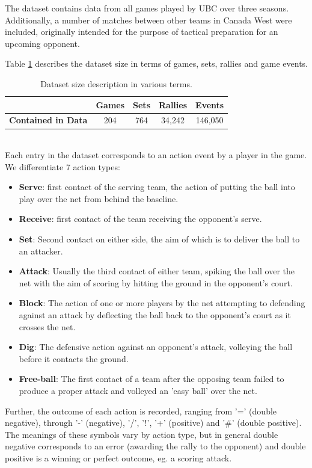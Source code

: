 \documentclass{sfuthesis}
\begin{document}
	The dataset contains data from all games played by UBC over three seasons. Additionally, a number of matches between other teams in Canada West were included, originally intended for the purpose of tactical preparation for an upcoming opponent.
	
	Table \ref{tab:data-numbers} describes the dataset size in terms of games, sets, rallies and game events.\\
	\begin{table}[ht]
		\centering
		\begin{tabular}{c|c|c|c|c}
			& \textbf{Games} & \textbf{Sets} & \textbf{Rallies} & \textbf{Events} \\ \hline
			\textbf{Contained in Data} & 204            & 764           & 34,242           & 146,050        
		\end{tabular}
		\caption{Dataset size description in various terms.}
		\label{tab:data-numbers}
	\end{table}
	\\Each entry in the dataset corresponds to an action event by a player in the game. We differentiate 7 action types:
	\begin{itemize}
		\item \textbf{Serve}: first contact of the serving team, the action of putting the ball into play over the net from behind the baseline.
		\item \textbf{Receive}: first contact of the team receiving the opponent's serve.
		\item \textbf{Set}: Second contact on either side, the aim of which is to deliver the ball to an attacker.
		\item \textbf{Attack}: Usually the third contact of either team, spiking the ball over the net with the aim of scoring by hitting the ground in the opponent's court.
		\item \textbf{Block}: The action of one or more players by the net attempting to defending against an attack by deflecting the ball back to the opponent's court as it crosses the net.
		\item \textbf{Dig}: The defensive action against an opponent's attack, volleying the ball before it contacts the ground.
		\item \textbf{Free-ball}: The first contact of a team after the opposing team failed to produce a proper attack and volleyed an 'easy ball' over the net.
	\end{itemize}
	Further, the outcome of each action is recorded, ranging from '=' (double negative), through '-' (negative), '/', '!', '+' (positive) and '\#' (double positive). The meanings of these symbols vary by action type, but in general double negative corresponds to an error (awarding the rally to the opponent) and double positive is a winning or perfect outcome, eg. a scoring attack.
	
\end{document}
